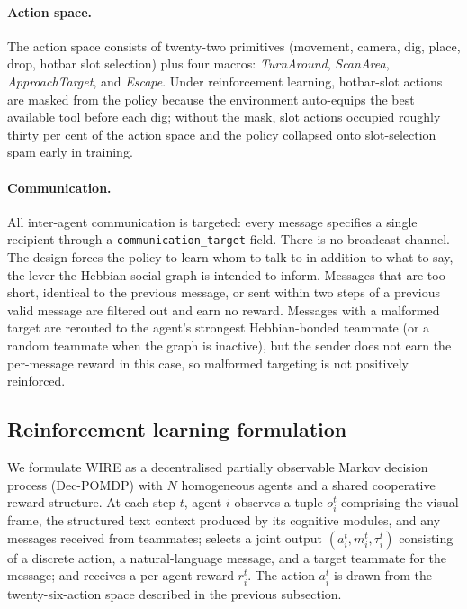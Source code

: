 \paragraph{Action space.}
The action space consists of twenty-two primitives (movement, camera, dig, place, drop, hotbar slot selection) plus four macros: \emph{TurnAround}, \emph{ScanArea}, \emph{ApproachTarget}, and \emph{Escape}. Under reinforcement learning, hotbar-slot actions are masked from the policy because the environment auto-equips the best available tool before each dig; without the mask, slot actions occupied roughly thirty per cent of the action space and the policy collapsed onto slot-selection spam early in training.

\paragraph{Communication.}
All inter-agent communication is targeted: every message specifies a single recipient through a \texttt{communication\_target} field. There is no broadcast channel. The design forces the policy to learn whom to talk to in addition to what to say, the lever the Hebbian social graph is intended to inform. Messages that are too short, identical to the previous message, or sent within two steps of a previous valid message are filtered out and earn no reward. Messages with a malformed target are rerouted to the agent's strongest Hebbian-bonded teammate (or a random teammate when the graph is inactive), but the sender does not earn the per-message reward in this case, so malformed targeting is not positively reinforced.

\subsection{Reinforcement learning formulation}
\label{sec:rl_formulation}

We formulate WIRE as a decentralised partially observable Markov decision process (Dec-POMDP) \cite{bernstein2002complexity} with $N$ homogeneous agents and a shared cooperative reward structure. At each step $t$, agent $i$ observes a tuple $o_i^t$ comprising the visual frame, the structured text context produced by its cognitive modules, and any messages received from teammates; selects a joint output $(a_i^t, m_i^t, \tau_i^t)$ consisting of a discrete action, a natural-language message, and a target teammate for the message; and receives a per-agent reward $r_i^t$. The action $a_i^t$ is drawn from the twenty-six-action space described in the previous subsection.

